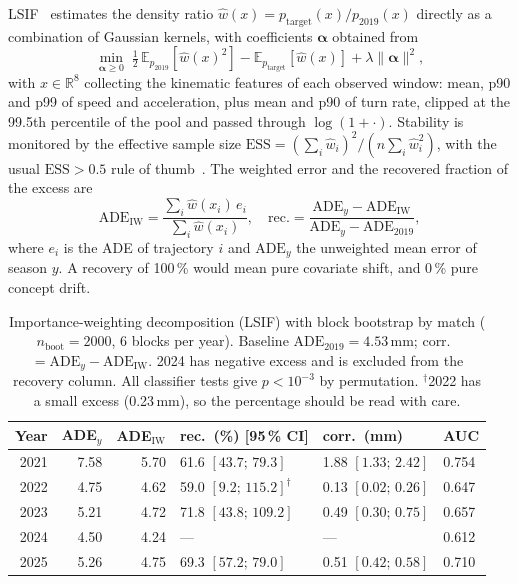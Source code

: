 \documentclass[runningheads]{llncs}
\begin{document}
LSIF~\cite{kliep,kanamori2009,sugiyama_book} estimates the density ratio
$\hat{w}(x) = p_{\text{target}}(x)/p_{2019}(x)$ directly as a combination of
Gaussian kernels, with coefficients $\boldsymbol\alpha$ obtained from
\begin{equation}\label{eq:lsif}
\min_{\boldsymbol\alpha \geq 0}\;
\tfrac{1}{2}\,\mathbb{E}_{p_{2019}}[\hat{w}(x)^2] -
\mathbb{E}_{p_{\text{target}}}[\hat{w}(x)] + \lambda\|\boldsymbol\alpha\|^2 ,
\end{equation}
with $x \in \mathbb{R}^{8}$ collecting the kinematic features of each observed
window: mean, p90 and p99 of speed and acceleration, plus mean and p90 of turn
rate, clipped at the 99.5th percentile of the pool and passed through
$\log(1+\cdot)$. Stability is monitored by the effective sample size
$\mathrm{ESS} = (\sum_i \hat{w}_i)^2/(n\sum_i \hat{w}_i^2)$, with the usual
$\mathrm{ESS} > 0.5$ rule of thumb~\cite{sugiyama_book}. The weighted error and
the recovered fraction of the excess are
\begin{equation}\label{eq:recovery}
\mathrm{ADE}_{\mathrm{IW}} = \frac{\sum_i \hat{w}(x_i)\,e_i}{\sum_i \hat{w}(x_i)},
\quad
\mathrm{rec.} = \frac{\mathrm{ADE}_y - \mathrm{ADE}_{\mathrm{IW}}}
                     {\mathrm{ADE}_y - \mathrm{ADE}_{2019}} ,
\end{equation}
where $e_i$ is the ADE of trajectory $i$ and $\mathrm{ADE}_y$ the
unweighted mean error of season $y$.
A recovery of 100\,\% would mean pure covariate shift, and 0\,\% pure concept
drift.

\begin{table}[t]
\centering
\caption{Importance-weighting decomposition (LSIF) with block bootstrap by
match ($n_{\text{boot}} = 2000$, 6 blocks per year). Baseline
$\mathrm{ADE}_{2019} = 4.53$\,mm; corr.\ $= \mathrm{ADE}_y -
\mathrm{ADE}_{\mathrm{IW}}$. 2024 has negative excess and is excluded from the
recovery column. All classifier tests give $p < 10^{-3}$ by permutation.
$^{\dagger}$2022 has a small excess (0.23\,mm), so the percentage should be
read with care.}
\label{tab:iw}
\small
\setlength{\tabcolsep}{3pt}
\begin{tabular}{@{}rrrlll@{}}
\toprule
\textbf{Year} & \textbf{ADE$_y$} & \textbf{ADE$_{\mathrm{IW}}$}
 & \textbf{rec.\ (\%) [95\,\% CI]} & \textbf{corr.\ (mm)} & \textbf{AUC} \\
\midrule
2021 & 7.58 & 5.70 & 61.6 $[43.7;\,79.3]$          & 1.88 $[1.33;\,2.42]$ & 0.754 \\
2022 & 4.75 & 4.62 & 59.0 $[9.2;\,115.2]^{\dagger}$ & 0.13 $[0.02;\,0.26]$ & 0.647 \\
2023 & 5.21 & 4.72 & 71.8 $[43.8;\,109.2]$          & 0.49 $[0.30;\,0.75]$ & 0.657 \\
2024 & 4.50 & 4.24 & ---                            & ---                  & 0.612 \\
2025 & 5.26 & 4.75 & 69.3 $[57.2;\,79.0]$           & 0.51 $[0.42;\,0.58]$ & 0.710 \\
\bottomrule
\end{tabular}
\end{table}
\end{document}
